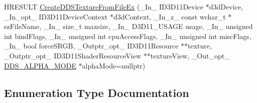 \begin{DoxyCompactItemize}
\item 
H\+R\+E\+S\+U\+LT \hyperlink{namespace_direct_x_a3fe71d8982208e409bf9ea67dcb11e99_a3fe71d8982208e409bf9ea67dcb11e99}{Create\+D\+D\+S\+Texture\+From\+File\+Ex} (\+\_\+\+In\+\_\+ I\+D3\+D11\+Device $\ast$d3d\+Device, \+\_\+\+In\+\_\+opt\+\_\+ I\+D3\+D11\+Device\+Context $\ast$d3d\+Context, \+\_\+\+In\+\_\+z\+\_\+ const wchar\+\_\+t $\ast$sz\+File\+Name, \+\_\+\+In\+\_\+ size\+\_\+t maxsize, \+\_\+\+In\+\_\+ D3\+D11\+\_\+\+U\+S\+A\+GE usage, \+\_\+\+In\+\_\+ unsigned int bind\+Flags, \+\_\+\+In\+\_\+ unsigned int cpu\+Access\+Flags, \+\_\+\+In\+\_\+ unsigned int misc\+Flags, \+\_\+\+In\+\_\+ bool force\+S\+R\+GB, \+\_\+\+Outptr\+\_\+opt\+\_\+ I\+D3\+D11\+Resource $\ast$$\ast$texture, \+\_\+\+Outptr\+\_\+opt\+\_\+ I\+D3\+D11\+Shader\+Resource\+View $\ast$$\ast$texture\+View, \+\_\+\+Out\+\_\+opt\+\_\+ \hyperlink{namespace_direct_x_a7cb48689d75471680c0bf7f79caaaf1f_a7cb48689d75471680c0bf7f79caaaf1f}{D\+D\+S\+\_\+\+A\+L\+P\+H\+A\+\_\+\+M\+O\+DE} $\ast$alpha\+Mode=nullptr)
\end{DoxyCompactItemize}


\subsection{Enumeration Type Documentation}
